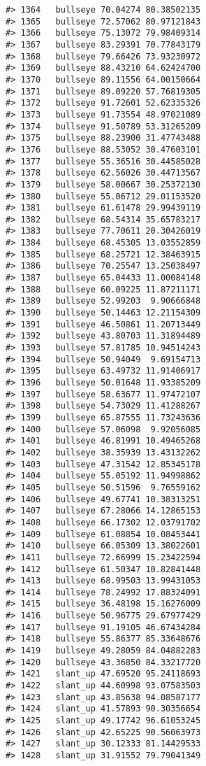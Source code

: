 \documentclass[
]{book}
\theoremstyle{definition}
\theoremstyle{definition}
\theoremstyle{definition}
\theoremstyle{definition}
\theoremstyle{remark}
\begin{document}
\begin{verbatim}
#> 1364   bullseye 70.04274 80.38502135
#> 1365   bullseye 72.57062 80.97121843
#> 1366   bullseye 75.13072 79.98409314
#> 1367   bullseye 83.29391 70.77843179
#> 1368   bullseye 79.66426 73.93230972
#> 1369   bullseye 88.43210 64.62424700
#> 1370   bullseye 89.11556 64.00150664
#> 1371   bullseye 89.09220 57.76819305
#> 1372   bullseye 91.72601 52.62335326
#> 1373   bullseye 91.73554 48.97021089
#> 1374   bullseye 91.50789 53.31265209
#> 1375   bullseye 88.23900 31.47743488
#> 1376   bullseye 88.53052 30.47603101
#> 1377   bullseye 55.36516 30.44585028
#> 1378   bullseye 62.56026 30.44713567
#> 1379   bullseye 58.00667 30.25372130
#> 1380   bullseye 55.06712 29.01153520
#> 1381   bullseye 61.61478 29.99439119
#> 1382   bullseye 68.54314 35.65783217
#> 1383   bullseye 77.70611 20.30426019
#> 1384   bullseye 68.45305 13.03552859
#> 1385   bullseye 68.25721 12.38463915
#> 1386   bullseye 70.25547 13.25038497
#> 1387   bullseye 65.04433 11.00084148
#> 1388   bullseye 60.09225 11.87211171
#> 1389   bullseye 52.99203  9.90666848
#> 1390   bullseye 50.14463 12.21154309
#> 1391   bullseye 46.50861 11.20713449
#> 1392   bullseye 43.80703 11.31894489
#> 1393   bullseye 57.81785 10.94514243
#> 1394   bullseye 50.94049  9.69154713
#> 1395   bullseye 63.49732 11.91406917
#> 1396   bullseye 50.01648 11.93385209
#> 1397   bullseye 58.63677 11.97472107
#> 1398   bullseye 54.73029 11.41288267
#> 1399   bullseye 65.87555 11.73243636
#> 1400   bullseye 57.06098  9.92056085
#> 1401   bullseye 46.81991 10.49465268
#> 1402   bullseye 38.35939 13.43132262
#> 1403   bullseye 47.31542 12.85345178
#> 1404   bullseye 55.05192 11.94998862
#> 1405   bullseye 50.51596  9.76559162
#> 1406   bullseye 49.67741 10.38313251
#> 1407   bullseye 67.28066 14.12865153
#> 1408   bullseye 66.17302 12.03791702
#> 1409   bullseye 61.08854 10.08453441
#> 1410   bullseye 66.05309 13.38022601
#> 1411   bullseye 72.66999 15.23422594
#> 1412   bullseye 61.50347 10.82841448
#> 1413   bullseye 68.99503 13.99431053
#> 1414   bullseye 78.24992 17.88324091
#> 1415   bullseye 36.48198 15.16276009
#> 1416   bullseye 50.96775 29.67977429
#> 1417   bullseye 91.19105 46.67434284
#> 1418   bullseye 55.86377 85.33648676
#> 1419   bullseye 49.28059 84.04882283
#> 1420   bullseye 43.36850 84.33217720
#> 1421   slant_up 47.69520 95.24118693
#> 1422   slant_up 44.60998 93.07583503
#> 1423   slant_up 43.85638 94.08587177
#> 1424   slant_up 41.57893 90.30356654
#> 1425   slant_up 49.17742 96.61053245
#> 1426   slant_up 42.65225 90.56063973
#> 1427   slant_up 30.12333 81.14429533
#> 1428   slant_up 31.91552 79.79041349

\end{verbatim}
\end{document}
